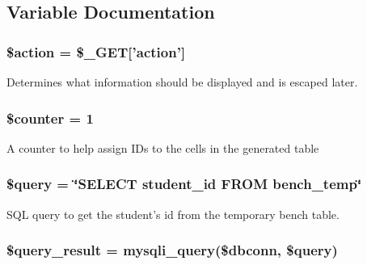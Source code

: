 \subsection{\-Variable \-Documentation}
\hypertarget{updateBenchDB_8php_aa698a3e72116e8e778be0e95d908ee30}{
\subsubsection[{\$action}]{\setlength{\rightskip}{0pt plus 5cm}\$action = \$\-\_\-\-G\-E\-T\mbox{[}'action'\mbox{]}}}\label{updateBenchDB_8php_aa698a3e72116e8e778be0e95d908ee30}
\-Determines what information should be displayed and is escaped later. \hypertarget{updateBenchDB_8php_adc0a189fac719187ba2e6f01ca0f2466}{
\subsubsection[{\$counter}]{\setlength{\rightskip}{0pt plus 5cm}\$counter = 1}}\label{updateBenchDB_8php_adc0a189fac719187ba2e6f01ca0f2466}
\-A counter to help assign \-I\-Ds to the cells in the generated table \hypertarget{updateBenchDB_8php_af59a5f7cd609e592c41dc3643efd3c98}{
\subsubsection[{\$query}]{\setlength{\rightskip}{0pt plus 5cm}\$query = \char`\"{}\-S\-E\-L\-E\-C\-T student\-\_\-id \-F\-R\-O\-M bench\-\_\-temp\char`\"{}}}\label{updateBenchDB_8php_af59a5f7cd609e592c41dc3643efd3c98}
\-S\-Q\-L query to get the student's id from the temporary bench table. \hypertarget{updateBenchDB_8php_ade0b3dacf5d65d8f2293ffa78561fe31}{
\subsubsection[{\$query\-\_\-result}]{\setlength{\rightskip}{0pt plus 5cm}\$query\-\_\-result = mysqli\-\_\-query(\$dbconn, \$query)}}\label{updateBenchDB_8php_ade0b3dacf5d65d8f2293ffa78561fe31}
